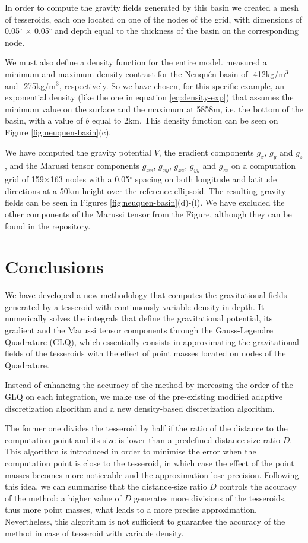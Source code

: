 \documentclass[extra]{gji}
\begin{document}
In order to compute the gravity fields generated by this basin we created a
mesh of tesseroids, each one located on one of the nodes of the grid, with
dimensions of 0.05$^\circ$ $\times$ 0.05$^\circ$ and depth equal to the
thickness of the basin on the corresponding node.

We must also define a density function for the entire model.
\citet{Sigismondi2012} measured a minimum and maximum density contrast for
the Neuqu\'en basin of -412kg/m$^3$ and -275kg/m$^3$, respectively.
So we have chosen, for this specific example, an exponential density (like the
one in equation \ref{eq:density-exp}) that assumes the minimum value on the
surface and the maximum at 5858m, i.e. the bottom of the basin, with a value
of $b$ equal to 2km.
This density function can be seen on Figure \ref{fig:neuquen-basin}(c).

We have computed the gravity potential $V$, the gradient components $g_x$,
$g_y$ and $g_z$, and the Marussi tensor components $g_{xx}$, $g_{xy}$,
$g_{xz}$, $g_{yy}$  and $g_{zz}$ on a computation grid of 159$\times$163 nodes
with a 0.05$^\circ$ spacing on both longitude and latitude directions at a
50km height over the reference ellipsoid.
The resulting gravity fields can be seen in Figures
\ref{fig:neuquen-basin}(d)-(l).
We have excluded the other components of the Marussi tensor from the Figure,
although they can be found in the repository.



\section{Conclusions}

We have developed a new methodology that computes the gravitational fields
generated by a tesseroid with continuously variable density in depth.
It numerically solves the integrals that define the gravitational potential,
its gradient and the Marussi tensor components through the Gauss-Legendre
Quadrature (GLQ), which essentially consists in approximating the
gravitational fields of the tesseroids with the effect of point masses located
on nodes of the Quadrature.

Instead of enhancing the accuracy of the method by increasing the order of the
GLQ on each integration, we make use of the pre-existing modified adaptive
discretization algorithm and a new density-based discretization algorithm.

The former one divides the tesseroid by half if the ratio of the distance to
the computation point and its size is lower than a predefined distance-size
ratio $D$.
This algorithm is introduced in order to minimise the error when the
computation point is close to the tesseroid, in which case the effect of the
point masses becomes more noticeable and the approximation lose precision.
Following this idea, we can summarise that the distance-size ratio $D$
controls the accuracy of the method: a higher value of $D$ generates more
divisions of the tesseroids, thus more point masses, what leads to a more
precise approximation.
Nevertheless, this algorithm is not sufficient to guarantee the accuracy of
the method in case of tesseroid with variable density.
\end{document}
